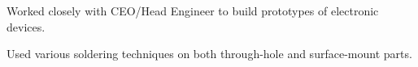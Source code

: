 


\begin{rExperience}

  \item Worked closely with CEO/Head Engineer to build prototypes of electronic devices.

  \item Used various soldering techniques on both through-hole and surface-mount parts.

\end{rExperience}

